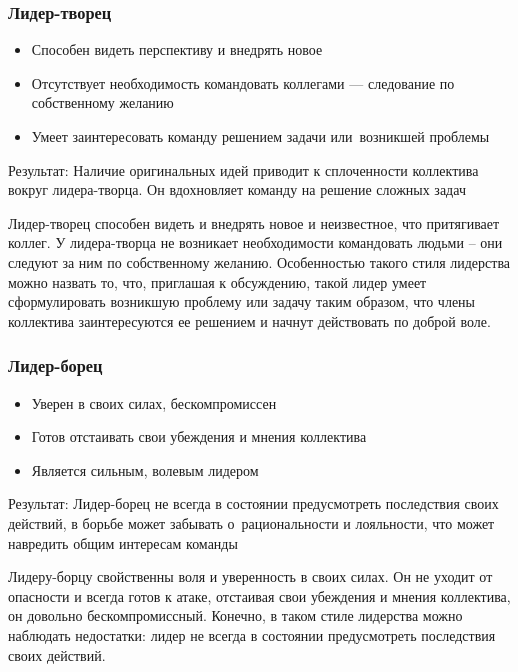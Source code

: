 \documentclass{../industrial-development}
\begin{document}
\begin{frame} \frametitle{Лидер-творец}
\begin{itemize}
  \item Способен видеть перспективу и внедрять новое
  \item Отсутствует необходимость командовать коллегами --- следование по собственному желанию
  \item Умеет заинтересовать команду решением задачи или~возникшей проблемы 
  \end{itemize}
  \begin{block}{Результат:}
	Наличие оригинальных идей приводит к сплоченности коллектива вокруг лидера-творца. Он вдохновляет команду на решение сложных задач
  \end{block}
\end{frame}
\lecturenotes Лидер-творец способен видеть и внедрять новое и неизвестное, что притягивает коллег. У лидера-творца не возникает необходимости командовать людьми – они следуют за ним по собственному желанию. Особенностью такого стиля лидерства можно назвать то, что, приглашая к обсуждению, такой лидер умеет сформулировать возникшую проблему или задачу таким образом, что члены коллектива заинтересуются ее решением и начнут действовать по доброй воле.



\begin{frame} \frametitle{Лидер-борец}
\begin{itemize}
  \item Уверен в своих силах, бескомпромиссен
  \item Готов отстаивать свои убеждения и мнения коллектива 
  \item Является сильным, волевым лидером
  \end{itemize}
\begin{block}{Результат:}
Лидер-борец не всегда в состоянии предусмотреть последствия своих действий, в борьбе может забывать о~рациональности и лояльности, что может навредить общим интересам команды
\end{block}
\end{frame}
\lecturenotes Лидеру-борцу свойственны воля и уверенность в своих силах. Он не уходит от опасности и всегда готов к атаке, отстаивая свои убеждения и мнения коллектива, он довольно бескомпромиссный. Конечно, в таком стиле лидерства можно наблюдать недостатки: лидер не всегда в состоянии предусмотреть последствия своих действий.
\end{document}
